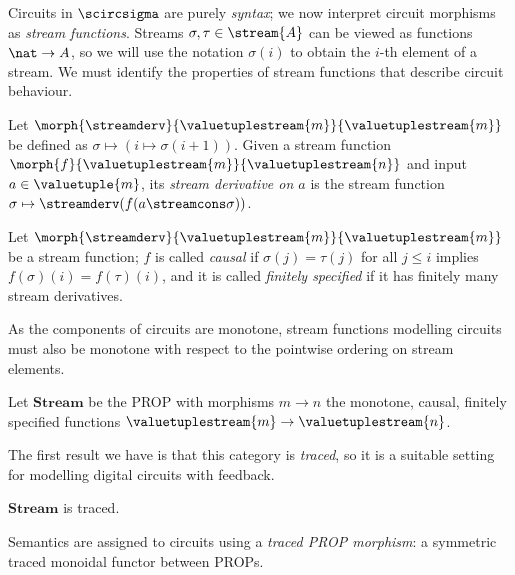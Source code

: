 \documentclass[10pt]{article}
\begin{document}
Circuits in \(\scircsigma\) are purely \emph{syntax}; we now interpret circuit
morphisms as \emph{stream functions}.
Streams \(\sigma,\tau \in \stream{A}\) can be viewed as functions
\(\nat \to A\), so we will use the notation \(\sigma(i)\) to obtain the \(i\)-th
element of a stream.
We must identify the properties of stream functions that describe circuit
behaviour.

\begin{definition}
    Let \(\morph{\streamderv}{\valuetuplestream{m}}{\valuetuplestream{m}}\) be
    defined as \(\sigma \mapsto (i \mapsto \sigma(i+1))\).
    Given a stream function \(
    \morph{f}{\valuetuplestream{m}}{\valuetuplestream{n}}
    \) and input \(a \in \valuetuple{m}\), its \emph{stream derivative on \(a\)}
    is the stream function \(
    \sigma \mapsto \streamderv(f(a \streamcons \sigma))
    \).
\end{definition}

\begin{definition}
    Let \(\morph{\streamderv}{\valuetuplestream{m}}{\valuetuplestream{m}}\) be
    a stream function; \(f\) is called \emph{causal} if \(\sigma(j) = \tau(j)\)
    for all \(j \leq i\) implies \(f(\sigma)(i) = f(\tau)(i)\), and it is called
    \emph{finitely specified} if it has finitely many stream derivatives.
\end{definition}

As the components of circuits are monotone, stream functions modelling circuits
must also be monotone with respect to the pointwise ordering on stream elements.

\begin{definition}
    Let \(\mathbf{Stream}\) be the PROP with morphisms \(m \to n\) the monotone,
    causal, finitely specified functions
    \(\valuetuplestream{m} \to \valuetuplestream{n}\).
\end{definition}

The first result we have is that this category is \emph{traced}, so it is a
suitable setting for modelling digital circuits with feedback.

\begin{proposition}
    \(\mathbf{Stream}\) is traced.
\end{proposition}

Semantics are assigned to circuits using a \emph{traced PROP morphism}: a
symmetric traced monoidal functor between PROPs.
\end{document}
